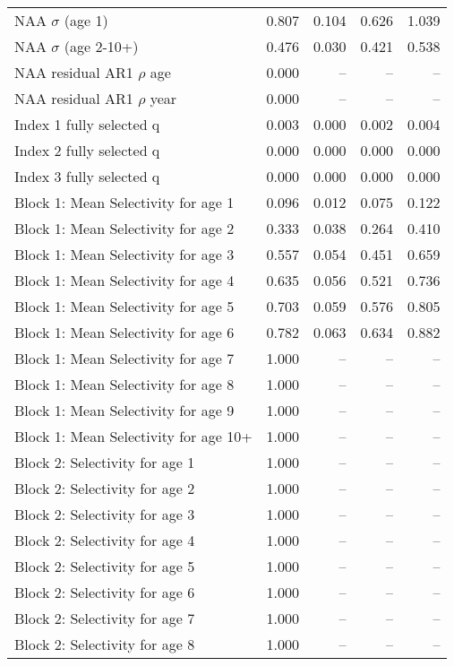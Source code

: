 \documentclass[
]{article}
\begin{document}
\begin{landscape}
\begin{longtable}[t]{lrrrr}
\endfoot
\bottomrule
\endlastfoot
NAA $\sigma$ (age 1) & 0.807 & 0.104 & 0.626 & 1.039\\
NAA $\sigma$ (age 2-10+) & 0.476 & 0.030 & 0.421 & 0.538\\
NAA residual AR1 $\rho$ age & 0.000 & -- & -- & --\\
NAA residual AR1 $\rho$ year & 0.000 & -- & -- & --\\
Index 1 fully selected q & 0.003 & 0.000 & 0.002 & 0.004\\
\addlinespace
Index 2 fully selected q & 0.000 & 0.000 & 0.000 & 0.000\\
Index 3 fully selected q & 0.000 & 0.000 & 0.000 & 0.000\\
Block 1: Mean Selectivity for age 1 & 0.096 & 0.012 & 0.075 & 0.122\\
Block 1: Mean Selectivity for age 2 & 0.333 & 0.038 & 0.264 & 0.410\\
Block 1: Mean Selectivity for age 3 & 0.557 & 0.054 & 0.451 & 0.659\\
\addlinespace
Block 1: Mean Selectivity for age 4 & 0.635 & 0.056 & 0.521 & 0.736\\
Block 1: Mean Selectivity for age 5 & 0.703 & 0.059 & 0.576 & 0.805\\
Block 1: Mean Selectivity for age 6 & 0.782 & 0.063 & 0.634 & 0.882\\
Block 1: Mean Selectivity for age 7 & 1.000 & -- & -- & --\\
Block 1: Mean Selectivity for age 8 & 1.000 & -- & -- & --\\
\addlinespace
Block 1: Mean Selectivity for age 9 & 1.000 & -- & -- & --\\
Block 1: Mean Selectivity for age 10+ & 1.000 & -- & -- & --\\
Block 2: Selectivity for age 1 & 1.000 & -- & -- & --\\
Block 2: Selectivity for age 2 & 1.000 & -- & -- & --\\
Block 2: Selectivity for age 3 & 1.000 & -- & -- & --\\
\addlinespace
Block 2: Selectivity for age 4 & 1.000 & -- & -- & --\\
Block 2: Selectivity for age 5 & 1.000 & -- & -- & --\\
Block 2: Selectivity for age 6 & 1.000 & -- & -- & --\\
Block 2: Selectivity for age 7 & 1.000 & -- & -- & --\\
Block 2: Selectivity for age 8 & 1.000 & -- & -- & --\\

\end{longtable}
\end{landscape}
\end{document}
